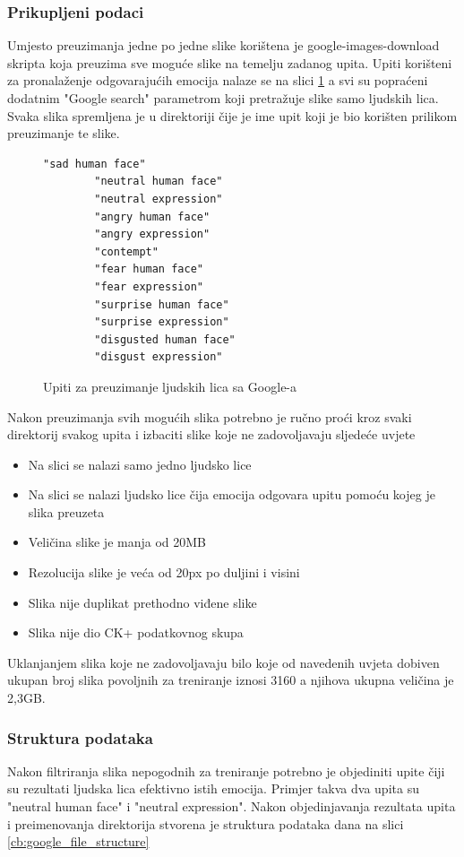 \documentclass[times, utf8, zavrsni,numeric,pstricks]{fer}
\begin{document}
\subsubsection{Prikupljeni podaci}
Umjesto preuzimanja jedne po jedne slike korištena je google-images-download skripta \cite{google-images-download} koja preuzima sve moguće slike na temelju zadanog upita. Upiti korišteni za pronalaženje odgovarajućih emocija nalaze se na slici \ref{cb:google_queries} a svi su popraćeni dodatnim "Google search" parametrom koji pretražuje slike samo ljudskih lica. Svaka slika spremljena je u direktoriji čije je ime upit koji je bio korišten prilikom preuzimanje te slike. 

\begin{figure}[H]
	\centering
		\begin{Verbatim}[fontsize=\small]
		"sad human face"
		"neutral human face"
		"neutral expression"
		"angry human face"
		"angry expression"
		"contempt"
		"fear human face"
		"fear expression"
		"surprise human face"
		"surprise expression"
		"disgusted human face"
		"disgust expression"
		\end{Verbatim}
	\caption{Upiti za preuzimanje ljudskih lica sa Google-a}
	\label{cb:google_queries}
\end{figure}

\noindent
Nakon preuzimanja svih mogućih slika potrebno je ručno proći kroz svaki direktorij svakog upita i izbaciti slike koje ne zadovoljavaju sljedeće uvjete \label{google_npy_filter}

\begin{itemize}
	\item Na slici se nalazi samo jedno ljudsko lice
	\item Na slici se nalazi ljudsko lice čija emocija odgovara upitu pomoću kojeg je slika preuzeta
	\item Veličina slike je manja od 20MB
	\item Rezolucija slike je veća od 20px po duljini i visini
	\item Slika nije duplikat prethodno viđene slike
	\item Slika nije dio CK+ podatkovnog skupa
\end{itemize}
Uklanjanjem slika koje ne zadovoljavaju bilo koje od navedenih uvjeta dobiven ukupan broj slika povoljnih za treniranje iznosi 3160 a njihova ukupna veličina je 2,3GB.

\subsubsection{Struktura podataka}
Nakon filtriranja slika nepogodnih za treniranje potrebno je objediniti upite čiji su rezultati ljudska lica efektivno istih emocija. Primjer takva dva upita su "neutral human face" i "neutral expression". Nakon objedinjavanja rezultata upita i preimenovanja direktorija stvorena je struktura podataka dana na slici \ref{cb:google_file_structure}
\end{document}
